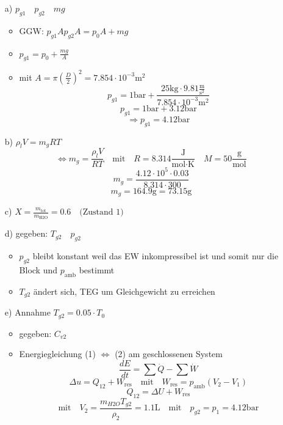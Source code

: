 \begin{enumerate}
    \item[a)] $p_{g1} \quad p_{g2} \quad mg$
    \begin{itemize}
        \item GGW: $p_{g1} A p_{g2} A = p_0 A + mg$
        \item $p_{g1} = p_0 + \frac{mg}{A}$
        \item mit $A = \pi \left( \frac{D}{2} \right)^2 = 7.854 \cdot 10^{-3} \text{m}^2$
        \[
        p_{g1} = 1 \text{bar} + \frac{25 \text{kg} \cdot 9.81 \frac{\text{m}}{\text{s}^2}}{7.854 \cdot 10^{-3} \text{m}^2}
        \]
        \[
        p_{g1} = 1 \text{bar} + 3.12 \text{bar}
        \]
        \[
        \Rightarrow p_{g1} = 4.12 \text{bar}
        \]
    \end{itemize}
    \item[b)] $\rho_l V = m_g RT$
    \[
    \Leftrightarrow m_g = \frac{\rho_l V}{RT} \quad \text{mit} \quad R = 8.314 \frac{\text{J}}{\text{mol} \cdot \text{K}} \quad M = 50 \frac{\text{g}}{\text{mol}}
    \]
    \[
    m_g = \frac{4.12 \cdot 10^5 \cdot 0.03}{8.314 \cdot 300}
    \]
    \[
    m_g = 164.9 \text{g} = 73.15 \text{g}
    \]
    \item[c)] $X = \frac{m_{\text{tot}}}{m_{\text{H2O}}} = 0.6 \quad \text{(Zustand 1)}$
    \item[d)] gegeben: $T_{g2} \quad p_{g2}$
    \begin{itemize}
        \item $p_{g2}$ bleibt konstant weil das EW inkompressibel ist und somit nur die Block und $p_{\text{amb}}$ bestimmt
        \item $T_{g2}$ ändert sich, TEG um Gleichgewicht zu erreichen
    \end{itemize}
    \item[e)] Annahme $T_{g2} = 0.05 \cdot T_0$
    \begin{itemize}
        \item gegeben: $C_{v2}$
        \item Energiegleichung (1) $\Leftrightarrow$ (2) am geschlossenen System
        \[
        \frac{dE}{dt} = \sum \dot{Q} - \sum \dot{W}
        \]
        \[
        \Delta u = Q_{12} + W_{\text{res}} \quad \text{mit} \quad W_{\text{res}} = p_{\text{amb}} (V_2 - V_1)
        \]
        \[
        Q_{12} = \Delta U + W_{\text{res}}
        \]
        \[
        \text{mit} \quad V_2 = \frac{m_{H2O} T_{g2}}{\rho_2} = 1.1 \text{L} \quad \text{mit} \quad p_{g2} = p_1 = 4.12 \text{bar}
        \]
    \end{itemize}
\end{enumerate}

